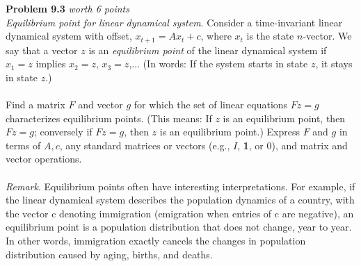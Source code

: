 \documentclass{article}
\newenvironment{problem}[3][Problem]
    { \begin{mdframed}[backgroundcolor=gray!20] \textbf{#1 #2} \textit{worth #3 points} \\}
    {  \end{mdframed}}
\begin{document}
\newpage
\begin{problem}{9.3}{6}
\textit{Equilibrium point for linear dynamical system}. Consider a time-invariant linear dynamical system with offset, $x_{t+1} = Ax_t +c$, where $x_t$ is the state $n$-vector. We say that a vector $z$ is an \textit{equilibrium point} of the linear dynamical system if $x_1 = z$ implies $x_2 = z$, $x_3 = z$,$\ldots$ (In words: If the system starts in state $z$, it stays in state $z$.)\\
\\
Find a matrix $F$ and vector $g$ for which the set of linear equations $F z = g$ characterizes equilibrium points. (This means: If $z$ is an equilibrium point, then $F z = g$; conversely if $F z = g$, then $z$ is an equilibrium point.) Express $F$ and $g$ in terms of $A, c$, any standard matrices or vectors (e.g., $I$, \textbf{1}, or 0), and matrix and vector operations.\\
\\
\textit{Remark}. Equilibrium points often have interesting interpretations. For example, if the linear dynamical system describes the population dynamics of a country, with the vector c denoting immigration (emigration when entries of c are negative), an equilibrium point is a population distribution that does not change, year to year. In other words, immigration exactly cancels the changes in population distribution caused by aging, births, and deaths.
\end{problem}
\end{document}

